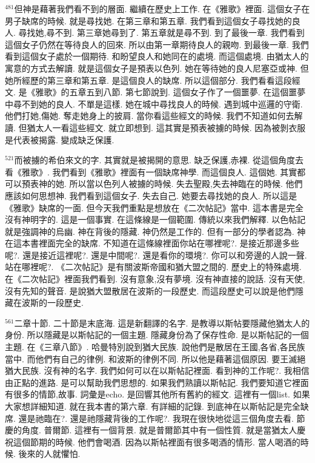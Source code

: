 \documentclass{book}
\begin{document}
$^{481}$但神是藉著我們看不到的層面.
繼續在歷史上工作.
在《雅歌》裡面.
這個女子在男子缺席的時候.
就是尋找她.
在第三章和第五章.
我們看到這個女子尋找她的良人.
尋找她,尋不到.
第三章她尋到了.
第五章就是尋不到.
到了最後一章.
我們看到這個女子仍然在等待良人的回來.
所以由第一章期待良人的親吻.
到最後一章.
我們看到這個女子處於一個期待.
和盼望良人和她同在的處境.
而這個處境.
由猶太人的寓意的方式去解讀.
就是這個女子是預表以色列.
她在等待她的良人尼塞亞或神.
但她所經歷的第三章和第五章.
是這個良人的缺席.
所以這個部分.
我們看看這段經文.
是《雅歌》的五章五到八節.
第七節說到.
這個女子作了一個噩夢.
在這個噩夢中尋不到她的良人.
不單是這樣.
她在城中尋找良人的時候.
遇到城中巡邏的守衛.
他們打她,傷她.
奪走她身上的披肩.
當你看這些經文的時候.
我們不知道如何去解讀.
但猶太人一看這些經文.
就立即想到.
這其實是預表被擄的時候.
因為被剝衣服是代表被揭露.
變成缺乏保護.

$^{521}$而被擄的希伯來文的字.
其實就是被揭開的意思.
缺乏保護,赤裸.
從這個角度去看《雅歌》.
我們看到《雅歌》裡面有一個缺席神學.
而這個良人.
這個她.
其實都可以預表神的她.
所以當以色列人被擄的時候.
失去聖殿,失去神臨在的時候.
他們應該如何思想神.
我們看到這個女子.
失去自己.
她要去尋找她的良人.
所以這是《雅歌》缺席的一面.
但今天我們重點是想放在《二次帖記》當中.
這本書是完全沒有神明字的.
這是一個事實.
在這條線是一個範圍.
傳統以來我們解釋.
以色帖記就是強調神的烏幽.
神在背後的隱藏.
神仍然是工作的.
但有一部分的學者認為.
神在這本書裡面完全的缺席.
不知道在這條線裡面你站在哪裡呢?.
是接近那邊多些呢?.
還是接近這裡呢?.
還是中間呢?.
還是看你的環境?.
你可以和旁邊的人說一聲.
站在哪裡呢?.
《二次帖記》是有關波斯帝國和猶大盟之間的.
歷史上的特殊處境.
在《二次帖記》裡面我們看到.
沒有意象,沒有夢境.
沒有神直接的說話.
沒有天使,沒有先知的聲音.
是說猶大盟散居在波斯的一段歷史.
而這段歷史可以說是他們隱藏在波斯的一段歷史.

$^{561}$二章十節.
二十節是末底海.
這是新翻譯的名字.
是教導以斯帖要隱藏他猶太人的身份.
所以隱藏是以斯帖記的一個主題.
隱藏身份為了保存性命.
是以斯帖記的一個主題.
在《三章八節》.
哈曼特別說到猶大民族.
說他們是散居在王國,各省,各民族當中.
而他們有自己的律例.
和波斯的律例不同.
所以他是藉著這個原因.
要王滅絕猶大民族.
沒有神的名字.
我們如何可以在以斯帖記裡面.
看到神的工作呢?.
我相信由正點的進路.
是可以幫助我們思想的.
如果我們熟讀以斯帖記.
我們要知道它裡面有很多的情節,故事.
詞彙是echo.
是回響其他所有舊約的經文.
這裡有一個list.
如果大家想詳細知道.
就在我本書的第六章.
有詳細的記錄.
到底神在以斯帖記是完全缺席.
還是祂臨在?.
還是祂隱藏背後的工作呢?.
我現在很快地從這三個角度去看.
節慶的角度.
普爾節.
這裡有一個背景.
就是普爾節其中有一個性質.
就是當猶太人慶祝這個節期的時候.
他們會喝酒.
因為以斯帖裡面有很多喝酒的情形.
當人喝酒的時候.
後來的人就懼怕.
\end{document}
